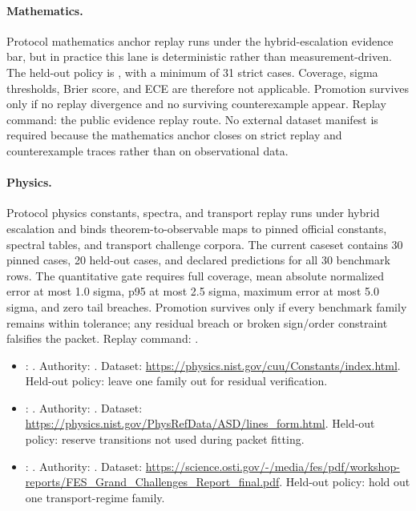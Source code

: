 \paragraph{Mathematics.}
Protocol mathematics anchor replay runs under the
hybrid-escalation evidence bar, but in practice this lane is deterministic
rather than measurement-driven. The held-out policy is
, with a minimum of 31
strict cases. Coverage, sigma thresholds, Brier score, and ECE are therefore
not applicable. Promotion survives only if no replay divergence and no
surviving counterexample appear. Replay command:
the public evidence replay route. No
external dataset manifest is required because the mathematics anchor closes on
strict replay and counterexample traces rather than on observational data.

\paragraph{Physics.}
Protocol physics constants, spectra, and transport replay runs
under hybrid escalation and binds theorem-to-observable maps to pinned official
constants, spectral tables, and transport challenge corpora. The current
caseset contains 30 pinned cases, 20 held-out cases, and declared predictions
for all 30 benchmark rows. The quantitative gate requires full coverage, mean
absolute normalized error at most 1.0 sigma, p95 at most 2.5 sigma, maximum
error at most 5.0 sigma, and zero tail breaches. Promotion survives only if
every benchmark family remains within tolerance; any residual breach or broken
sign/order constraint falsifies the packet. Replay command:
.
\begin{itemize}[leftmargin=1.5em,nosep]
\item {}: . Authority: . Dataset: \url{https://physics.nist.gov/cuu/Constants/index.html}. Held-out policy: leave one family out for residual verification.
\item {}: . Authority: . Dataset: \url{https://physics.nist.gov/PhysRefData/ASD/lines_form.html}. Held-out policy: reserve transitions not used during packet fitting.
\item {}: . Authority: . Dataset: \url{https://science.osti.gov/-/media/fes/pdf/workshop-reports/FES_Grand_Challenges_Report_final.pdf}. Held-out policy: hold out one transport-regime family.
\end{itemize}

